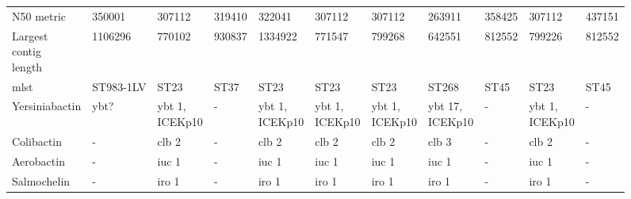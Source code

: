 \begin{sidewaystable}[ht]
\begin{threeparttable}
\begin{tabularx}{\textwidth}{lllllllllll}
                    N50 metric &                 350001 &                           307112 &            319410 &                   322041 &                          307112 &                         307112 &                           263911 &                  358425 &                           307112 &                  437151 \\
 \mCL{Largest\\contig\\length} &                1106296 &                           770102 &            930837 &                  1334922 &                          771547 &                         799268 &                           642551 &                  812552 &                           799226 &                  812552 \\
\midrule
                    \gls{mlst} &              ST983-1LV &                             ST23 &              ST37 &                     ST23 &                            ST23 &                           ST23 &                            ST268 &                    ST45 &                             ST23 &                    ST45 \\
                Yersiniabactin &                   ybt? &            \mCL{ybt 1,\\ICEKp10} &                 - &    \mCL{ybt 1,\\ICEKp10} &           \mCL{ybt 1,\\ICEKp10} &          \mCL{ybt 1,\\ICEKp10} &           \mCL{ybt 17,\\ICEKp10} &                       - &            \mCL{ybt 1,\\ICEKp10} &                       - \\
                    Colibactin &                      - &                            clb 2 &                 - &                    clb 2 &                           clb 2 &                          clb 2 &                            clb 3 &                       - &                            clb 2 &                       - \\
                    Aerobactin &                      - &                            iuc 1 &                 - &                    iuc 1 &                           iuc 1 &                          iuc 1 &                            iuc 1 &                       - &                            iuc 1 &                       - \\
                   Salmochelin &                      - &                            iro 1 &                 - &                    iro 1 &                           iro 1 &                          iro 1 &                            iro 1 &                       - &                            iro 1 &                       - \\

\end{tabularx}
\end{threeparttable}
\end{sidewaystable}
